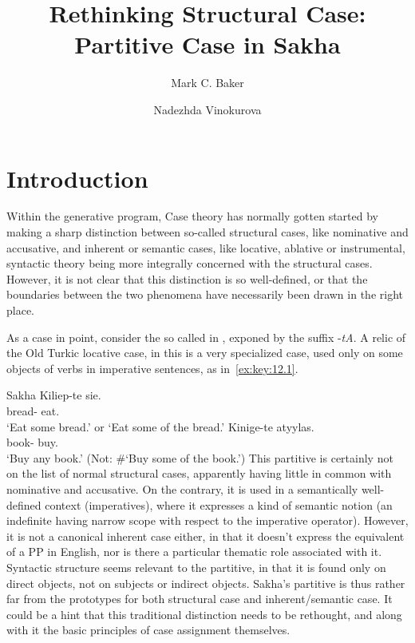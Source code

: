 \documentclass[output=paper]{langsci/langscibook}
\author{Mark C. Baker\affiliation{Rutgers University}\and Nadezhda Vinokurova\affiliation{Institute for Humanities Research and Indigenous Studies of the North, Siberian Branch, Russian Academy of Sciences}}
\title{Rethinking Structural Case: Partitive Case in Sakha}
\begin{document}
\glsresetall

\section{Introduction}

Within the generative program, Case theory has normally gotten started by
making a sharp distinction between so-called structural cases, like nominative
and accusative, and inherent or semantic
cases, like locative, ablative or
instrumental, syntactic theory being more integrally concerned with the
structural cases. However, it is not clear that this distinction is so
well-defined, or that the boundaries between the two phenomena have necessarily
been drawn in the right place.

As a case in point, consider the so called  in , exponed by
the suffix -\emph{tA}. A relic of the Old Turkic locative case, in  this
is a very specialized case, used only on some objects of verbs in imperative
sentences, as in~\eqref{ex:key:12.1}.

\ea\label{ex:key:12.1}Sakha \parencite[421, 429]{StachowskiMenz1998}
	\ea
		\gll Kiliep-te  sie.\\
			bread-\Part{}  eat.\Imp{}\\
		\glt ‘Eat some bread.’ or ‘Eat some of the bread.’
	\ex
		\gll Kinige-te  atyylas.\\
			book-\Part{}  buy.\Imp{}\\
		\glt ‘Buy any book.’  (Not: \#‘Buy some of the book.’)
	\z
\z
This partitive is certainly not on the list of normal
structural cases, apparently having little in common with nominative and
accusative. On the contrary, it is used in a semantically
well-defined context (imperatives), where it expresses a kind of semantic
notion (an indefinite having narrow scope with respect to the
imperative operator). However, it is not a canonical
inherent
case either, in that it doesn’t express the equivalent of a PP in English, nor
is there a particular thematic role associated with it. Syntactic structure
seems relevant to the partitive, in that it is found only on
direct objects, not on subjects or indirect objects. Sakha’s
partitive is thus rather far from the prototypes for both
structural case and inherent/semantic case. It could be a hint that this
traditional distinction needs to be rethought, and along with it the basic
principles of case assignment themselves.
\end{document}
